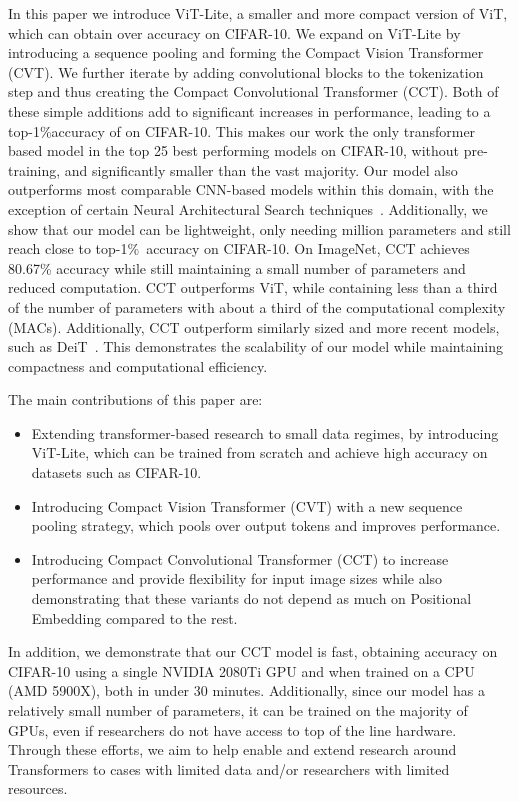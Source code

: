 \documentclass[10pt,twocolumn,letterpaper]{article}
\begin{document}
In this paper we introduce ViT-Lite, a smaller and more compact version of ViT, which can obtain over  accuracy on CIFAR-10.
We expand on ViT-Lite by introducing a sequence pooling and forming the Compact Vision Transformer (CVT). We further iterate by adding convolutional blocks to the tokenization step and thus creating the Compact Convolutional Transformer (CCT).
Both of these simple additions add to significant increases in performance, leading to a top-1\%accuracy of  on CIFAR-10.
This makes our work the only transformer based model in the top 25 best performing models on CIFAR-10, without pre-training, and significantly smaller than the vast majority.
Our model also outperforms most comparable CNN-based models within this domain, with the exception of certain Neural Architectural Search techniques~\cite{cai2018proxylessnas}.
Additionally, we show that our model can be lightweight, only needing  million parameters and still reach close to  top-1\%~accuracy on CIFAR-10.
On ImageNet, CCT achieves 80.67\% accuracy while still maintaining a small number of parameters and reduced computation.
CCT outperforms ViT, while containing less than a third of the number of parameters with about a third of the computational complexity (MACs).
Additionally, CCT outperform similarly sized and more recent models, such as DeiT~\cite{huang2020improving}.
This demonstrates the scalability of our model while maintaining compactness and computational efficiency.

\clearpage
The main contributions of this paper are:
\begin{itemize}
    \item Extending transformer-based research to small data regimes, by introducing ViT-Lite, which can be trained from scratch and achieve high accuracy on datasets such as CIFAR-10.
    \item Introducing Compact Vision Transformer (CVT) with a new sequence pooling strategy, which pools over output tokens and improves performance.
    \item Introducing Compact Convolutional Transformer (CCT) to increase performance and provide flexibility for input image sizes while also demonstrating that these variants do not depend as much on Positional Embedding compared to the rest.
\end{itemize}

In addition, we demonstrate that our CCT model is fast, obtaining  accuracy on CIFAR-10 using a single NVIDIA 2080Ti GPU and  when trained on a CPU (AMD 5900X), both in under 30 minutes.
Additionally, since our model has a relatively small number of parameters, it can be trained on the majority of GPUs, even if researchers do not have access to top of the line hardware.
Through these efforts, we aim to help enable and extend research around Transformers to cases with limited data and/or researchers with limited resources.
\end{document}
